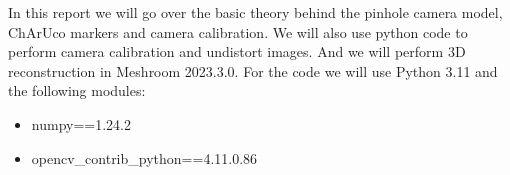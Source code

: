 In this report we will go over the basic theory behind the pinhole camera model, ChArUco markers and camera calibration. We will also use python code to perform camera calibration and undistort images. And we will perform 3D reconstruction in Meshroom 2023.3.0. For the code we will use Python 3.11 and the following modules: 
\begin{itemize}
    \item numpy==1.24.2
    \item opencv\_contrib\_python==4.11.0.86
\end{itemize}